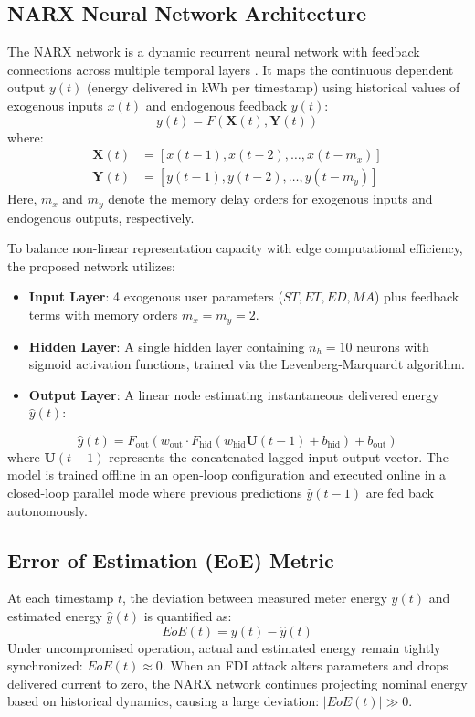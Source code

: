\documentclass[conference]{IEEEtran}
\begin{document}
\subsection{NARX Neural Network Architecture}
The NARX network is a dynamic recurrent neural network with feedback connections across multiple temporal layers \cite{Siegelmann1997}. It maps the continuous dependent output $y(t)$ (energy delivered in kWh per timestamp) using historical values of exogenous inputs $x(t)$ and endogenous feedback $y(t)$:
\begin{equation}
y(t) = F\left(\mathbf{X}(t), \mathbf{Y}(t)\right)
\label{eq:narx_general}
\end{equation}
where:
\begin{align}
\mathbf{X}(t) &= [x(t-1), x(t-2), \dots, x(t-m_x)] \\
\mathbf{Y}(t) &= [y(t-1), y(t-2), \dots, y(t-m_y)]
\end{align}
Here, $m_x$ and $m_y$ denote the memory delay orders for exogenous inputs and endogenous outputs, respectively.

To balance non-linear representation capacity with edge computational efficiency, the proposed network utilizes:
\begin{itemize}
    \item \textbf{Input Layer}: 4 exogenous user parameters ($ST, ET, ED, MA$) plus feedback terms with memory orders $m_x = m_y = 2$.
    \item \textbf{Hidden Layer}: A single hidden layer containing $n_h = 10$ neurons with sigmoid activation functions, trained via the Levenberg-Marquardt algorithm.
    \item \textbf{Output Layer}: A linear node estimating instantaneous delivered energy $\hat{y}(t)$:
\end{itemize}
\begin{equation}
\hat{y}(t) = F_{\text{out}}\left(w_{\text{out}} \cdot F_{\text{hid}}\left(w_{\text{hid}} \mathbf{U}(t-1) + b_{\text{hid}}\right) + b_{\text{out}}\right)
\label{eq:narx_math}
\end{equation}
where $\mathbf{U}(t-1)$ represents the concatenated lagged input-output vector. The model is trained offline in an open-loop configuration and executed online in a closed-loop parallel mode where previous predictions $\hat{y}(t-1)$ are fed back autonomously.

\subsection{Error of Estimation (EoE) Metric}
At each timestamp $t$, the deviation between measured meter energy $y(t)$ and estimated energy $\hat{y}(t)$ is quantified as:
\begin{equation}
EoE(t) = y(t) - \hat{y}(t)
\label{eq:eoe}
\end{equation}
Under uncompromised operation, actual and estimated energy remain tightly synchronized: $EoE(t) \approx 0$. When an FDI attack alters parameters and drops delivered current to zero, the NARX network continues projecting nominal energy based on historical dynamics, causing a large deviation: $|EoE(t)| \gg 0$.
\end{document}
